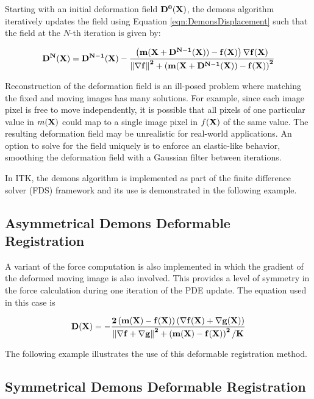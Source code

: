 Starting with an initial deformation field $\bf{D}^{0}(\bf{X})$, the demons
algorithm iteratively updates the field using Equation
\ref{eqn:DemonsDisplacement} such that the field at the $N$-th iteration is
given by:

\begin{equation}
\bf{D}^{N}(\bf{X}) = \bf{D}^{N-1}(\bf{X}) - \frac
{\left(  m(\bf{X}+ \bf{D}^{N-1}(\bf{X}))
- f(\bf{X}) \right) \nabla f(\bf{X})}
{\left\|  \nabla f \right\|^2 + \left(
m(\bf{X}+ \bf{D}^{N-1}(\bf{X}) )
 - f(\bf{X}) \right)^2 }
\label{eqn:DemonsUpdateEquation}
\end{equation}

Reconstruction of the deformation field is an ill-posed problem where
matching the fixed and moving images has many solutions. For example, since
each image pixel is free to move independently, it is possible that all
pixels of one particular value in $m(\bf{X})$ could map to a single image
pixel in $f(\bf{X})$ of the same value. The resulting deformation field may
be unrealistic for real-world applications. An option to solve for the field
uniquely is to enforce an elastic-like behavior, smoothing the deformation
field with a Gaussian filter between iterations.

In ITK, the demons algorithm is implemented as part of the finite difference
solver (FDS) framework and its use is demonstrated in the following example.

\subsection{Asymmetrical Demons Deformable Registration}
\label{sec:AsymmetricalDemonsDeformableRegistration}


A variant of the force computation is also implemented in which the gradient of
the deformed moving image is also involved. This provides a level of symmetry
in the force calculation during one iteration of the PDE update. The equation
used in this case is

\begin{equation}
\bf{D}(\bf{X}) = - \frac
{2 \left(  m(\bf{X}) - f(\bf{X}) \right) \left(  \nabla f(\bf{X}) +  \nabla g(\bf{X}) \right) }
{\left\|  \nabla f + \nabla g \right\|^2 + \left(  m(\bf{X}) - f(\bf{X}) \right)^2 / K }
\label{eqn:DemonsDisplacement2}
\end{equation}

The following example illustrates the use of this deformable registration
method.

\subsection{Symmetrical Demons Deformable Registration}
\label{sec:SymmetricalDemonsDeformableRegistration}




